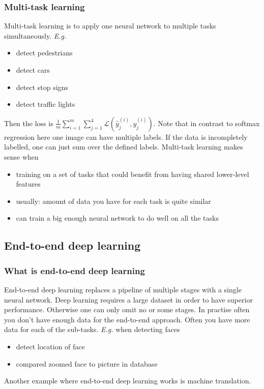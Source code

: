 \documentclass{article}
\begin{document}
\subsubsection{Multi-task learning}
Multi-task learning is to apply one neural network to multiple tasks simultaneously.
\emph{E.g.}
\begin{itemize}
  \item detect pedestrians
  \item detect cars
  \item detect stop signs
  \item detect traffic lights
\end{itemize}
Then the loss is $\frac{1}{m}\sum_{i=1}^m\sum_{j=1}^4\mathcal{L}(\hat{y}^{(i)}_j,y^{(i)}_j)$.
Note that in contrast to softmax regression here one image can have multiple labels.
If the data is incompletely labelled, one can just sum over the defined labels.
Multi-task learning makes sense when
\begin{itemize}
  \item training on a set of tasks that could benefit from having shared lower-level features
  \item usually: amount of data you have for each task is quite similar
  \item can train a big enough neural network to do well on all the tasks
\end{itemize}

\subsection{End-to-end deep learning}
\subsubsection{What is end-to-end deep learning}
End-to-end deep learning replaces a pipeline of multiple stages with a single neural network.
Deep learning requires a large dataset in order to have superior performance.
Otherwise one can only omit no or some stages.
In practise often you don't have enough data for the end-to-end approach.
Often you have more data for each of the sub-tasks.
\emph{E.g.} when detecting faces
\begin{itemize}
  \item detect location of face
  \item compared zoomed face to picture in database
\end{itemize}
Another example where end-to-end deep learning works is machine translation.
\end{document}
